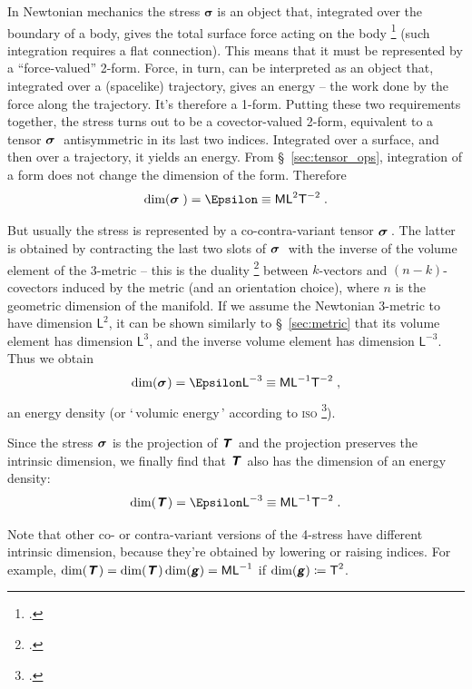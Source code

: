\documentclass[\ifafour a4paper,12pt,\else a5paper,10pt,\fi%
onecolumn,oneside,article,%
british%
]{memoir}
\makeatletter
\newcommand*{\defquote}[1]{`\,#1\,'}
\theoremstyle{remark}
\theoremstyle{innote}
\newcommand*{\mathte}[1]{\textbf{\textit{\textsf{#1}}}}
\newcommand*{\citep}{\footcites}
\newcommand*{\defd}{\coloneqq}
\renewcommand*{\|}[1][]{\nonscript\,#1\vert\nonscript\;\mathopen{}}
\newcommand*{\sect}{\S}%
\newcommand*{\chap}{ch.}%
\newcommand*{\q}{}%
\DeclareRobustCommand*{\q}{%
  \mathbin{\mathpalette\bigcdot@{}}%
}
\newcommand*{\bigcdot@scalefactor}{0.7}
\newcommand*{\bigcdot@widthfactor}{1.5}
\newcommand*{\bigcdot@}[2]{%
  \sbox0{$#1\vcenter{}$}%
  \sbox2{$#1\cdot\m@th$}%
  \hbox to \bigcdot@widthfactor\wd2{%
    \hfil
    \raise\ht0\hbox{%
      \scalebox{\bigcdot@scalefactor}{%
        \lower\ht0\hbox{$#1\bullet\m@th$}%
      }%
    }%
    \hfil
  }%
}
\newcommand*{\Le}{\textsf{L}}
\newcommand*{\Ti}{\textsf{T}}
\newcommand*{\Ma}{\textsf{M}}
\newcommand*{\En}{\Epsilon}%
\newcommand*{\yg}{\mathte{g}}
\newcommand*{\yT}{\mathte{T}}
\renewcommand*{\i}{\indices}
\newcommand*{\yt}{\bm{\sigma}}
\makeatother
\begin{document}
In Newtonian mechanics the stress $\yt$ is an object that, integrated over
the boundary of a body, gives the total surface force acting on the body
\citep[\chap~III]{truesdell1977_r1991} (such integration requires a flat
connection). This means that it must be represented by a
\enquote{force-valued} 2-form. Force, in turn, can be interpreted as an
object that, integrated over a (spacelike) trajectory, gives an energy --
the work done by the force along the trajectory. It's therefore a 1-form.
Putting these two requirements together, the stress turns out to be a
covector-valued 2-form, equivalent to a tensor $\yt\i{_{\q\;\q\q}}$
antisymmetric in its last two indices. Integrated over a surface, and then
over a trajectory, it yields an energy. From \sect~\ref{sec:tensor_ops},
integration of a form does not change the dimension of the form. Therefore
\begin{equation}
  \label{eq:dim_3stress_form}
  \dim(\yt\i{_{\q\;\q\q}}) = \En \equiv \Ma\Le^{2}\Ti^{-2} \;.
\end{equation}

But usually the stress is represented by a co-contra-variant tensor
$\yt\i{_{\q}^{\q}}$\,. The latter is obtained by contracting the last two
slots of $\yt\i{_{\q\;\q\q}}$ with the inverse of the volume element of the
3-metric -- this is the duality \citep[\sect~4.1.2]{bossavit1991} between
$k$-vectors and $(n-k)$-covectors induced by the metric (and an orientation
choice), where $n$ is the geometric dimension of the manifold. If we assume
the Newtonian 3-metric to have dimension $\Le^{2}$, it can be shown
similarly to \sect~\ref{sec:metric} that its volume element has dimension
$\Le^{3}$, and the inverse volume element has dimension $\Le^{-3}$. Thus we
obtain
\begin{equation}
  \label{eq:dim_3stress}
  \dim(\yt\i{_{\q}^{\q}}) = \En\Le^{-3} \equiv \Ma\Le^{-1}\Ti^{-2} \;,
\end{equation}
an energy density (or \defquote{volumic energy} according to \textsc{iso}
\citep[item~A.6.2]{iso2009}).

Since the stress $\yt\i{_{\q}^{\q}}$ is the projection of
$\yT\i{_{\q}^{\q}}$ and the projection preserves the intrinsic dimension, we
finally find that $\yT\i{_{\q}^{\q}}$ also has the dimension of an energy density:
\begin{equation}
  \label{eq:dim_4stress}
  \dim(\yT\i{_{\q}^{\q}}) = \En\Le^{-3} \equiv \Ma\Le^{-1}\Ti^{-2} \;.
\end{equation}

Note that other co- or contra-variant versions of the 4-stress  have
different intrinsic dimension, because they're obtained by lowering or
raising indices. For example,
$\dim(\yT\i{_{\q\q}})=\dim(\yT\i{_{\q}^{\q}})\dim(\yg)=\Ma\Le^{-1}$ if
$\dim(\yg)\defd \Ti^{2}$.
\end{document}
